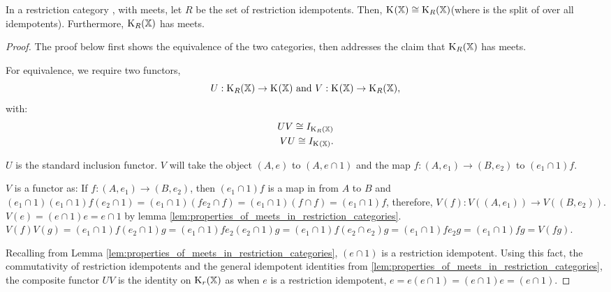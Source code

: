     \begin{proposition}\label{pro:in_rc_x_with_meets_split_x_is_cong_to_split_r_x}
      In a restriction category \X, with meets, let $R$ be the set of restriction idempotents.
      Then, $\text{K}_{}(\mathbb{X}) \cong \text{K}_{R}(\mathbb{X})$(where \spl{}{\X} is the split of \X over all idempotents). 
      Furthermore, $\text{K}_{R}(\mathbb{X})$ has meets.
    \end{proposition}
    \begin{proof}
      The proof below first shows the equivalence of the two categories, then addresses the claim 
      that $\text{K}_{R}(\mathbb{X})$ has meets.

      For equivalence, we require two functors,
      \[
        U:\text{K}_{R}(\mathbb{X})\to\text{K}_{}(\mathbb{X})\text{ and }V:\text{K}_{}(\mathbb{X})\to\text{K}_{R}(\mathbb{X}),
      \]
      with:
      \begin{align}
        U V \cong I_{\text{K}_{R}(\mathbb{X})}\\
        V U \cong I_{\text{K}_{}(\mathbb{X})}.
      \end{align}


      $U$ is the standard inclusion functor. $V$ will take the object $(A,e)$ to
      $(A,e\cap 1)$ and the map $f:(A,e_1)\to (B,e_2)$ to $(e_1\cap 1)f $.

      $V$ is a functor as:
      \bd
         If  $f:(A,e_1) \to (B,e_2)$, then
          $(e_1\cap 1) f $ is a map in \X from $A$ to $B$ and
          $ (e_1\cap 1)(e_1\cap 1) f  (e_2 \cap 1) =
          (e_1\cap 1) (f  e_2 \cap f ) = (e_1\cap 1) (f \cap f)= (e_1\cap 1) f$, therefore,
          $V(f):V((A,e_1)) \to V((B,e_2))$.
         $V(e) = (e\cap 1 ) e = e \cap 1$ by
          lemma \ref{lem:properties_of_meets_in_restriction_categories}.
         $V(f) V(g)
          = (e_1\cap 1 ) f (e_2 \cap 1) g
          = (e_1\cap 1 ) f e_2 (e_2 \cap 1) g
          = (e_1\cap 1 ) f  (e_2 \cap e_{2}) g
          = (e_1\cap 1 ) f e_2 g
          = (e_1\cap 1 ) f g
          = V(f g)$.
      \ed

      Recalling from Lemma \ref{lem:properties_of_meets_in_restriction_categories}, $(e\cap 1)$ 
      is a restriction idempotent. Using this fact, the commutativity of restriction idempotents
      and the general idempotent identities from  
      \vref{lem:properties_of_meets_in_restriction_categories}, the composite functor $U V$ is 
      the identity on $\text{K}_{r}(\mathbb{X})$ as when $e$ is a restriction idempotent,
      $e = e (e\cap 1) = (e\cap 1) e = (e\cap 1)$.


\end{proof}
